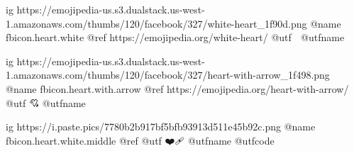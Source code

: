  
 
 
 
 

\ifcmt
	ig https://emojipedia-us.s3.dualstack.us-west-1.amazonaws.com/thumbs/120/facebook/327/white-heart_1f90d.png
	@name fbicon.heart.white
	@ref https://emojipedia.org/white-heart/
	@utf 🤍
	@utfname

	ig https://emojipedia-us.s3.dualstack.us-west-1.amazonaws.com/thumbs/120/facebook/327/heart-with-arrow_1f498.png
	@name fbicon.heart.with.arrow
	@ref https://emojipedia.org/heart-with-arrow/
	@utf 💘
	@utfname

	ig https://i.paste.pics/7780b2b917bf5bfb93913d511e45b92c.png
	@name fbicon.heart.white.middle
	@ref
	@utf ❤️🩹
	@utfname
	@utfcode
	
\fi
